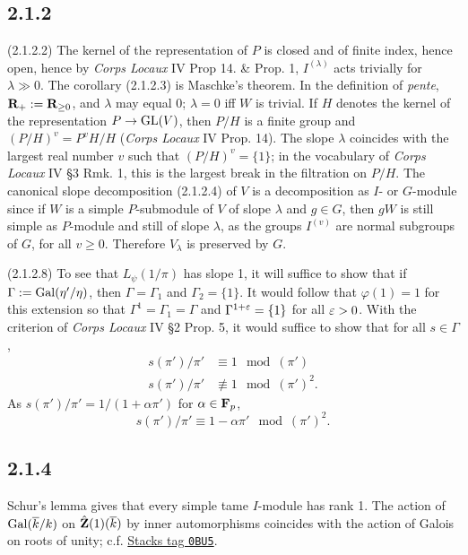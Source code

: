 \documentclass[deligne.tex]{subfiles}
\begin{document}
\subsection*{2.1.2}\label{laumon:2.1.2}
(2.1.2.2) The kernel of the representation of $P$ is closed and of finite
index, hence open, hence by \emph{Corps Locaux} IV Prop 14. \& Prop. 1,
$I^{(\lambda)}$ acts trivially for $\lambda\gg0$.
The corollary (2.1.2.3) is Maschke's theorem.
In the definition of \emph{pente}, $\mathbf{R}_+:=\mathbf{R}_{\geq0}$, and
$\lambda$ may equal $0$; $\lambda=0$ iff $W$ is trivial.
If $H$ denotes the kernel of the representation $P\rightarrow\operatorname{GL}(V)$, then
$P/H$ is a finite group and $(P/H)^v=P^vH/H$
(\emph{Corps Locaux} IV Prop. 14). The slope $\lambda$ coincides with the
largest real number $v$ such that $(P/H)^v=\{1\}$; in the vocabulary of
\emph{Corps Locaux} IV \S3 Rmk. 1, this is the largest break in the 
filtration on $P/H$.
The canonical slope decomposition (2.1.2.4) of $V$ is a decomposition as
$I$- or $G$-module since if $W$ is a simple $P$-submodule of $V$ of slope
$\lambda$ and $g\in G$, then $gW$ is still simple as $P$-module and still
of slope $\lambda$, as the groups $I^{(v)}$ are normal subgroups of $G$,
for all $v\geq0$. Therefore $V_\lambda$ is preserved by $G$.

(2.1.2.8) To see that $L_\psi(1/\pi)$ has slope 1, it will suffice to show
that if $\Gamma:=\operatorname{Gal}(\eta'/\eta)$, then $\Gamma=\Gamma_1$ and 
$\Gamma_2=\{1\}$. It would follow that $\varphi(1)=1$ for this extension so
that $\Gamma^1=\Gamma_1=\Gamma$ and $\Gamma^{1+\varepsilon}=\{1\}$ for all
$\varepsilon>0$. With the criterion of \emph{Corps Locaux} IV \S2 Prop. 5, it
would suffice to show that for all $s\in\Gamma$,
\begin{align*}
	s(\pi')/\pi'&\equiv1\mod (\pi') \\
	s(\pi')/\pi'&\not\equiv1\mod (\pi')^2.
\end{align*}
As $s(\pi')/\pi'=1/(1+\alpha\pi')$ for $\alpha\in\mathbf{F}_p$,
\begin{equation*}
	s(\pi')/\pi'\equiv 1-\alpha\pi'\mod(\pi')^2.
\end{equation*}


\subsection*{2.1.4} Schur's lemma gives that every simple tame $I$-module has rank 1.
The action of $\operatorname{Gal}(\overline k/k)$ on $\hat{\mathbf{Z}}(1)(\overline k)$ by inner
automorphisms coincides with the action of Galois on roots of unity;
c.f. \href{https://stacks.math.columbia.edu/tag/0BU5}{Stacks tag \texttt{0BU5}}.
\end{document}
